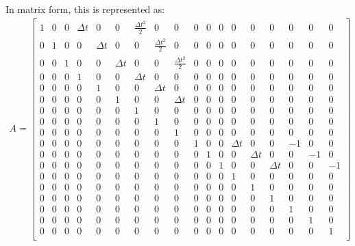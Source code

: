 \documentclass[12pt]{article}
\begin{document}
In matrix form, this is represented as:
\begin{align*}
A =     
\begin{bmatrix}
1 & 0 & 0 & \Delta t & 0 & 0 & \frac{\Delta t^2}{2} & 0 & 0 & 0 & 0 & 0 & 0 & 0 & 0 & 0 & 0 & 0\\
0 & 1 & 0 & 0 & \Delta t & 0 & 0 & \frac{\Delta t^2}{2} & 0 & 0 & 0 & 0 & 0 & 0 & 0 & 0 & 0 & 0\\
0 & 0 & 1 & 0 & 0 & \Delta t & 0 & 0 & \frac{\Delta t^2}{2} & 0 & 0 & 0 & 0 & 0 & 0 & 0 & 0 & 0\\
0 & 0 & 0 & 1 & 0 & 0 & \Delta t & 0 & 0 & 0 & 0 & 0 & 0 & 0 & 0 & 0 & 0  & 0\\ 
0 & 0 & 0 & 0 & 1 & 0 & 0 & \Delta t & 0 & 0 & 0 & 0 & 0 & 0 & 0 & 0 & 0  & 0\\         
0 & 0 & 0 & 0 & 0 & 1 & 0 & 0 & \Delta t & 0 & 0 & 0 & 0 & 0 & 0 & 0 & 0 & 0\\         
0 & 0 & 0 & 0 & 0 & 0 & 1 & 0 & 0 & 0 & 0 & 0 & 0 & 0 & 0 & 0 & 0  & 0\\         
0 & 0 & 0 & 0 & 0 & 0 & 0 & 1 & 0 & 0 & 0 & 0 & 0 & 0 & 0 & 0 & 0 & 0\\         
0 & 0 & 0 & 0 & 0 & 0 & 0 & 0 & 1 & 0 & 0 & 0 & 0 & 0 & 0 & 0 & 0  & 0 \\         
0 & 0 & 0 & 0 & 0 & 0 & 0 & 0 & 0 & 1 & 0 & 0 & \Delta t & 0 & 0 & - 1 & 0  & 0\\         
0 & 0 & 0 & 0 & 0 & 0 & 0 & 0 & 0 & 0 & 1 & 0 & 0 & \Delta t & 0 & 0 & - 1 & 0 \\         
0 & 0 & 0 & 0 & 0 & 0 & 0 & 0 & 0 & 0 & 0 & 1 & 0 & 0 & \Delta t & 0 & 0 & -1 \\         
0 & 0 & 0 & 0 & 0 & 0 & 0 & 0 & 0 & 0 & 0 & 0 & 1 & 0 & 0 & 0 & 0 & 0\\         
0 & 0 & 0 & 0 & 0 & 0 & 0 & 0 & 0 & 0 & 0 & 0 & 0 & 1 & 0 & 0 & 0 & 0\\         
0 & 0 & 0 & 0 & 0 & 0 & 0 & 0 & 0 & 0 & 0 & 0 & 0 & 0 & 1 & 0 & 0 & 0\\         
0 & 0 & 0 & 0 & 0 & 0 & 0 & 0 & 0 & 0 & 0 & 0 & 0 & 0 & 0 & 1 & 0 & 0\\         
0 & 0 & 0 & 0 & 0 & 0 & 0 & 0 & 0 & 0 & 0 & 0 & 0 & 0 & 0 & 0 & 1 & 0\\         
0 & 0 & 0 & 0 & 0 & 0 & 0 & 0 & 0 & 0 & 0 & 0 & 0 & 0 & 0 & 0 & 0 & 1\\         
\end{bmatrix}
\end{align*}
\end{document}
